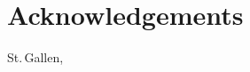

\chapter*{Acknowledgements}


\lipsum[1-3]

\vfill
\noindent
St.\,Gallen,
\makeatletter
\@submissiondate{}
\hfill
\@author
\makeatother
\vfill